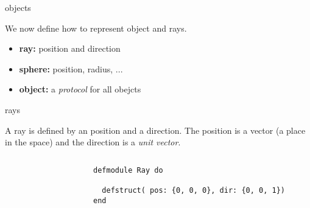 \begin{frame}[fragile]{objects}

We now define how to represent object and rays.

\pause
\begin{itemize}
  \item {\bf ray:} position and direction
  \item {\bf sphere:} position, radius, ...
  \item {\bf object:} a {\em protocol} for all obejcts
 \end{itemize}

\end{frame}

\begin{frame}[fragile]{rays}

  A ray is defined by an position and a direction. The position is a
  vector (a place in the space) and the direction is a {\em unit
    vector}.

\pause 

\begin{columns}[T]
 \begin{column}{0.3\linewidth}
  \begin{figure}
  \end{figure}  
  \end{column}

\pause

\begin{column}{0.7\linewidth}

\begin{verbatim}
defmodule Ray do

  defstruct( pos: {0, 0, 0}, dir: {0, 0, 1})
end
\end{verbatim}

  \end{column}
 \end{columns}
\end{frame}

